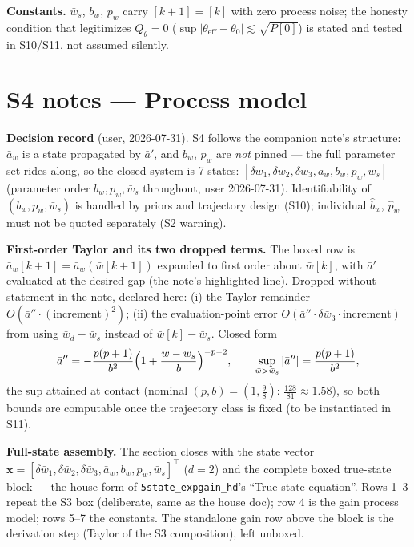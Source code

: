 \documentclass[11pt,a4paper,fontset=none]{ctexart}
\begin{document}
\textbf{Constants.}  $\bar{w}_s$, $b_w$, $p_w$ carry $[k+1]=[k]$ with zero
process noise; the honesty condition that legitimizes $Q_\theta = 0$
($\sup|\theta_{\mathrm{eff}}-\theta_0| \lesssim \sqrt{P[0]}$) is stated and
tested in S10/S11, not assumed silently.

\section*{S4 notes --- Process model}

\textbf{Decision record} (user, 2026-07-31).  S4 follows the companion
note's structure: $\bar{a}_w$ is a state propagated by $\bar{a}'$, and
$b_w$, $p_w$ are \emph{not} pinned --- the full parameter set rides along,
so the closed system is 7 states:
$[\delta\bar{w}_1, \delta\bar{w}_2, \delta\bar{w}_3, \bar{a}_w, b_w,
p_w, \bar{w}_s]$ (parameter order $b_w, p_w, \bar{w}_s$ throughout, user
2026-07-31).  Identifiability of $(b_w, p_w, \bar{w}_s)$ is handled by
priors and trajectory design (S10); individual $\hat{b}_w$, $\hat{p}_w$
must not be quoted separately (S2 warning).

\textbf{First-order Taylor and its two dropped terms.}  The boxed row is
$\bar{a}_w[k+1] = \bar{a}_w(\bar{w}[k+1])$ expanded to first order about
$\bar{w}[k]$, with $\bar{a}'$ evaluated at the desired gap (the note's
highlighted line).  Dropped without statement in the note, declared here:
(i) the Taylor remainder $O(\bar{a}''\cdot(\text{increment})^2)$;
(ii) the evaluation-point error
$O(\bar{a}''\cdot\delta\bar{w}_3\cdot\text{increment})$ from using
$\bar{w}_d-\bar{w}_s$ instead of $\bar{w}[k]-\bar{w}_s$.  Closed form
\begin{equation*}
\bar{a}'' = -\frac{p(p+1)}{b^2}
  \Bigl(1+\frac{\bar{w}-\bar{w}_s}{b}\Bigr)^{-p-2},
\qquad
\sup_{\bar{w}>\bar{w}_s}|\bar{a}''| = \frac{p(p+1)}{b^2},
\end{equation*}
the sup attained at contact (nominal $(p,b)=(1,\tfrac98)$:
$\tfrac{128}{81}\approx 1.58$), so both bounds are computable once the
trajectory class is fixed (to be instantiated in S11).

\textbf{Full-state assembly.}  The section closes with the state vector
$\mathbf{x} = [\delta\bar{w}_1, \delta\bar{w}_2, \delta\bar{w}_3,
\bar{a}_w, b_w, p_w, \bar{w}_s]^{\top}$ ($d=2$) and the complete boxed
true-state block --- the house form of \texttt{5state\_expgain\_hd}'s
``True state equation''.  Rows 1--3 repeat the S3 box (deliberate, same as
the house doc); row 4 is the gain process model; rows 5--7 the constants.
The standalone gain row above the block is the derivation step (Taylor of
the S3 composition), left unboxed.
\end{document}
